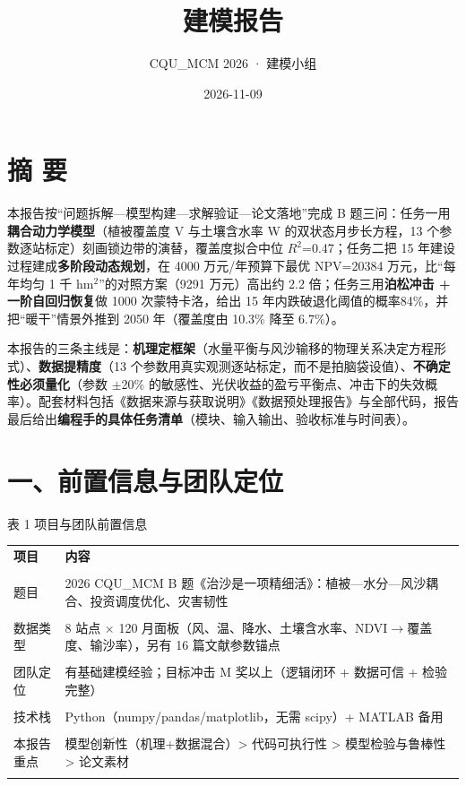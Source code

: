 \documentclass[11pt,a4paper]{ctexart}
\title{建模报告}
\author{CQU\_MCM 2026 · 建模小组}
\date{2026-11-09}
\begin{document}
\maketitle
\thispagestyle{empty}
\newpage

\section*{摘  要}
本报告按“问题拆解—模型构建—求解验证—论文落地”完成 B 题三问：任务一用\textbf{耦合动力学模型}（植被覆盖度 V 与土壤含水率 W 的双状态月步长方程，13 个参数逐站标定）刻画锁边带的演替，覆盖度拟合中位 $R^{2}$=0.47；任务二把 15 年建设过程建成\textbf{多阶段动态规划}，在 4000 万元/年预算下最优 NPV=20384 万元，比“每年均匀 1 千 hm$^{2}$”的对照方案（9291 万元）高出约 2.2 倍；任务三用\textbf{泊松冲击 + 一阶自回归恢复}做 1000 次蒙特卡洛，给出 15 年内跌破退化阈值的概率84\%，并把“暖干”情景外推到 2050 年（覆盖度由 10.3\% 降至 6.7\%）。

本报告的三条主线是：\textbf{机理定框架}（水量平衡与风沙输移的物理关系决定方程形式）、\textbf{数据提精度}（13 个参数用真实观测逐站标定，而不是拍脑袋设值）、\textbf{不确定性必须量化}（参数 $\pm$20\% 的敏感性、光伏收益的盈亏平衡点、冲击下的失效概率）。配套材料包括《数据来源与获取说明》《数据预处理报告》与全部代码，报告最后给出\textbf{编程手的具体任务清单}（模块、输入输出、验收标准与时间表）。


\section*{一、前置信息与团队定位}
表 1  项目与团队前置信息


\begin{table}[H]\centering\small\setlength{\parskip}{2pt}
\begin{tabularx}{\textwidth}{|X|X|}
\toprule
\textbf{项目} & \textbf{内容} \\\\
\midrule
题目 & 2026 CQU\_MCM B 题《治沙是一项精细活》：植被—水分—风沙耦合、投资调度优化、灾害韧性 \\\\
数据类型 & 8 站点 $\times$ 120 月面板（风、温、降水、土壤含水率、NDVI$\to$覆盖度、输沙率），另有 16 篇文献参数锚点 \\\\
团队定位 & 有基础建模经验；目标冲击 M 奖以上（逻辑闭环 + 数据可信 + 检验完整） \\\\
技术栈 & Python（numpy/pandas/matplotlib，无需 scipy）+ MATLAB 备用 \\\\
本报告重点 & 模型创新性（机理+数据混合）> 代码可执行性 > 模型检验与鲁棒性 > 论文素材 \\\\
\bottomrule
\end{tabularx}
\end{table}
\end{document}
